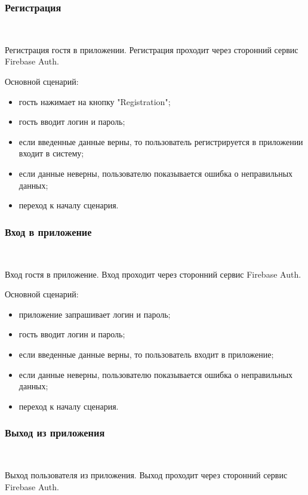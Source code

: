 \subsubsection{Регистрация}~\par

Регистрация гостя в приложении. Регистрация проходит через сторонний сервис Firebase Auth.

Основной сценарий:

\begin{itemize}
  \item гость нажимает на кнопку "Registration";
  \item гость вводит логин и пароль;
  \item если введенные данные верны, то пользователь регистрируется в приложении входит в систему;
  \item если данные неверны, пользователю показывается ошибка о неправильных данных;
  \item переход к началу сценария.
\end{itemize}

\subsubsection{Вход в приложение}~\par

Вход гостя в приложение. Вход проходит через сторонний сервис Firebase Auth.

Основной сценарий:

\begin{itemize}
  \item приложение запрашивает логин и пароль;
  \item гость вводит логин и пароль;
  \item если введенные данные верны, то пользователь входит в приложение;
  \item если данные неверны, пользователю показывается ошибка о неправильных данных;
  \item переход к началу сценария.
\end{itemize}

\subsubsection{Выход из приложения}~\par

Выход пользователя из приложения. Выход проходит через сторонний сервис Firebase Auth.

